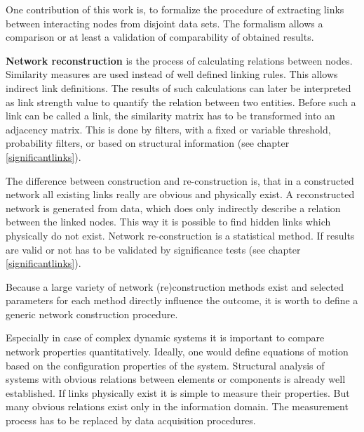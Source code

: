 \documentclass[a4paper,10pt]{scrbook}
\begin{document}
One contribution of this work is, to formalize the procedure of extracting links between interacting nodes from disjoint data sets. The formalism allows a comparison or at least a validation of comparability of obtained results. 

\textbf{Network reconstruction} is the process of calculating relations between nodes. Similarity measures are used instead of well defined linking rules. This allows indirect link definitions. The results of such calculations can later be interpreted as link strength value to quantify the relation between two entities. Before such a link can be called a link, the similarity matrix has to be transformed into an adjacency matrix. This is done by filters, with a fixed or variable threshold, probability filters, or based on structural information (see chapter \ref{significantlinks}). 

The difference between construction and re-construction is, that in a constructed network all existing links really are obvious and physically exist. A reconstructed network is generated from data, which does only indirectly describe a relation between the linked nodes. This way it is possible to find hidden links which physically do not exist. Network re-construction is a statistical method. If results are valid or not has to be validated by significance tests (see chapter \ref{significantlinks}).

Because a large variety of network (re)construction methods exist and selected parameters for each method directly influence the outcome, it is worth to define a generic network construction procedure. 

Especially in case of complex dynamic systems it is important to compare network properties quantitatively. Ideally, one would define equations of motion based on the configuration properties of the system. Structural analysis of systems with obvious relations between elements or components is already well established. If links physically exist it is simple to measure their properties. But many obvious relations exist only in the information domain. The measurement process has to be replaced by data acquisition procedures. 
\end{document}
